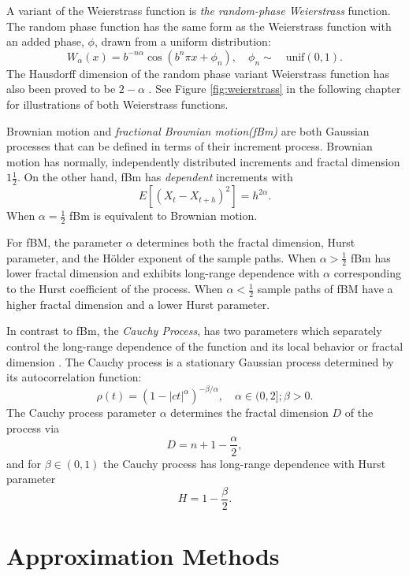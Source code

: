A variant of the Weierstrass function is \textit{ the random-phase 
Weierstrass} function.
The random phase function has the same form as the 
Weierstrass function with an added phase, $\phi$, drawn from 
a uniform distribution:
\[
  W_{\alpha}(x) 
   = b^{-n \alpha} \cos(b^n \pi x  + \phi_n), \hspace{1em} 
   \phi_n \sim \hspace{1em} \text{unif}(0,1).
\] 
The Hausdorff dimension of the random phase variant Weierstrass function has also been proved to be $2- \alpha$ \cite{hunt1998}. 
See Figure \ref{fig:weierstrass} in the following chapter 
for illustrations of both Weierstrass functions.

Brownian motion and \textit{fractional Brownian motion(fBm)} 
are both Gaussian processes that can be defined in terms of their increment process. 
Brownian motion has normally, independently 
distributed increments and fractal dimension 
$1 \frac{1}{2}$. On the other hand, fBm has 
 \textit{dependent} increments with
\[
  E[(X_{t} - X_{t +h} )^2] = h^{2\alpha}.
\]
When $\alpha = \frac{1}{2}$ fBm is equivalent to 
Brownian motion. 

For fBM, the parameter $\alpha$ determines both 
the fractal dimension, Hurst parameter, and the 
H\"older exponent of the sample paths.
When $\alpha > \frac{1}{2}$ fBm has lower fractal dimension and exhibits long-range dependence with $\alpha$ corresponding
to the Hurst coefficient of the process. 
When $\alpha < \frac{1}{2}$ sample paths of fBM have a 
higher fractal dimension and a lower Hurst parameter.

In contrast to fBm, the \textit{Cauchy Process}, 
has two parameters which separately control 
the long-range dependence of the function 
and its local behavior or fractal dimension \cite{gneiting2004}.
The Cauchy process is a stationary Gaussian process determined by
 its autocorrelation function:
\[
   \rho(t) =  (1 - |ct|^{\alpha})^{-\beta/\alpha}, 
   \hspace{1em} \alpha \in (0,2]; \beta > 0.
\]
The Cauchy process parameter $\alpha$ determines the fractal 
dimension $D$ of the process via 
  \[
    D = n + 1  - \frac{\alpha}{2},
  \]
and for $\beta \in (0,1)$ the Cauchy process has long-range 
  dependence with Hurst parameter 
  \[
    H  =   1 - \frac{\beta}{2}.
  \]

\section{Approximation Methods}

